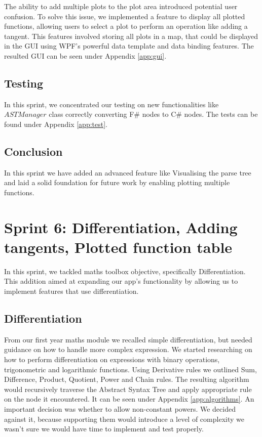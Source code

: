 \documentclass[a4paper, oneside, 11pt]{report}
\begin{document}
The ability to add multiple plots to the plot area introduced potential user confusion. To solve this issue, we implemented a feature to display all plotted functions, allowing users to select a plot to perform an operation like adding a tangent. This features involved storing all plots in a map, that could be displayed in the GUI using WPF's powerful data template and data binding features. The resulted GUI can be seen under Appendix \ref{app:gui}.

\subsection{Testing}
In this sprint, we concentrated our testing on new functionalities like $ASTManager$ class correctly converting F\# nodes to C\# nodes. The tests can be found under Appendix \ref{app:test}.

\subsection{Conclusion}
In this sprint we have added an advanced feature like Visualising the parse tree and laid a solid foundation for future work by enabling plotting multiple functions.

\section{Sprint 6: Differentiation, Adding tangents, Plotted function table}
In this sprint, we tackled maths toolbox objective, specifically Differentiation. This addition aimed at expanding our app's functionality by allowing us to implement features that use differentiation.

\subsection{Differentiation}
From our first year maths module we recalled simple differentiation, but needed guidance on how to handle more complex expression. We started researching on how to perform differentiation on expressions with binary operations, trigonometric and logarithmic functions. Using Derivative rules\cite{Derivatives} we outlined Sum, Difference, Product, Quotient, Power and Chain rules. The resulting algorithm would recursively traverse the Abstract Syntax Tree and apply appropriate rule on the node it encountered. It can be seen under Appendix \ref{app:algorithms}. An important decision was whether to allow non-constant powers. We decided against it, because supporting them would introduce a level of complexity we wasn't sure we would have time to implement and test properly.
\end{document}
